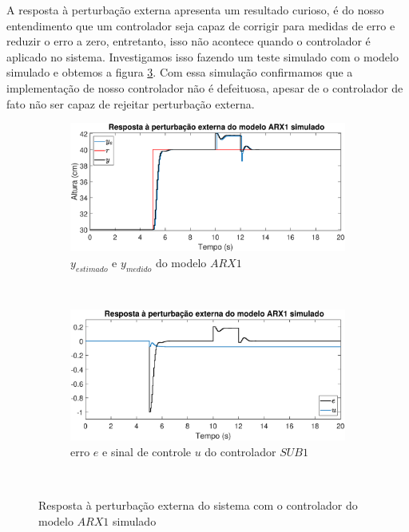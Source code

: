 A resposta à perturbação externa apresenta um resultado curioso, é do nosso entendimento que um controlador seja capaz de corrigir para medidas de erro e reduzir o erro a zero, entretanto, isso não acontece quando o controlador é aplicado no sistema. Investigamos isso fazendo um teste simulado com o modelo simulado e obtemos a figura \ref{fig:steparx1}. Com essa simulação confirmamos que a implementação de nosso controlador não é defeituosa, apesar de o controlador de fato não ser capaz de rejeitar perturbação externa.

\begin{figure}[htb]
	\centering
	\begin{subfigure}[t]{0.48\textwidth}
		\includegraphics[width=1\linewidth]{pasta1_figuras/steparx1simy}
		\caption[$y_{estimado}$ e $y_{medido}$ do modelo $ARX1$]{$y_{estimado}$ e $y_{medido}$ do modelo $ARX1$}
		\label{fig:steparx1simy}
	\end{subfigure}
	~ %
	\begin{subfigure}[t]{0.48\textwidth}
		\includegraphics[width=1\linewidth]{pasta1_figuras/steparx1sime}
		\caption[erro $e$ e sinal de controle $u$ do controlador $SUB1$]{erro $e$ e sinal de controle $u$ do controlador $SUB1$}
		\label{fig:steparx1e}
	\end{subfigure}
	~ %
	
	\caption{Resposta à perturbação externa do sistema com o controlador do modelo $ARX1$ simulado}\label{fig:steparx1}
\end{figure}



